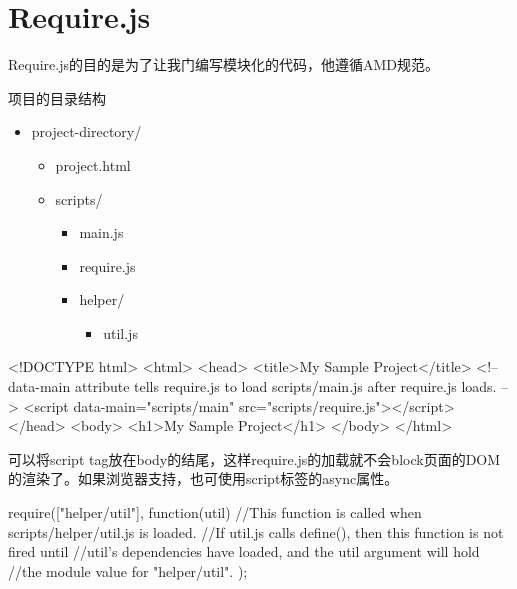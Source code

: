\section{Require.js}
Require.js的目的是为了让我门编写模块化的代码，他遵循AMD规范。

项目的目录结构
\renewcommand{\labelitemi}{$\triangleright$}
\renewcommand{\labelitemii}{$\triangleright$}
\renewcommand{\labelitemiii}{$\triangleright$}
\renewcommand{\labelitemiv}{$\triangleright$}
\begin{itemize}
\item project-directory/
	\begin{itemize}
	\item project.html
	\item scripts/
		\begin{itemize}
		\item main.js
		\item require.js
		\item helper/
			\begin{itemize}
			\item util.js
			\end{itemize}
		\end{itemize}			
	\end{itemize}
\end{itemize}




\begin{HTML5}
<!DOCTYPE html>
<html>
    <head>
        <title>My Sample Project</title>
        <!-- data-main attribute tells require.js to load
             scripts/main.js after require.js loads. -->
        <script data-main="scripts/main" src="scripts/require.js"></script>
    </head>
    <body>
        <h1>My Sample Project</h1>
    </body>
</html>
\end{HTML5}
可以将script tag放在body的结尾，这样require.js的加载就不会block页面的DOM的渲染了。如果浏览器支持，也可使用script标签的async属性。

\begin{JavaScript}
require(["helper/util"], function(util) {
    //This function is called when scripts/helper/util.js is loaded.
    //If util.js calls define(), then this function is not fired until
    //util's dependencies have loaded, and the util argument will hold
    //the module value for "helper/util".
});
\end{JavaScript}

